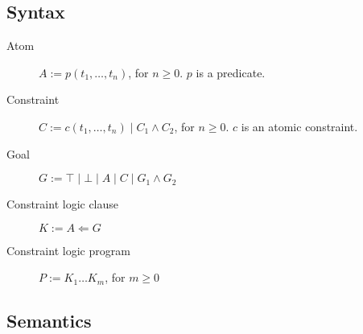 \subsection{Syntax}

\begin{description}
    \item[Atom] 
        $A := p(t_1, \dots, t_n)$, for $n \geq 0$. $p$ is a predicate.
    \item[Constraint] 
        $C := c(t_1, \dots, t_n) \mid C_1 \land C_2$, for $n \geq 0$. $c$ is an atomic constraint.
    \item[Goal] 
        $G := \top \mid \bot \mid A \mid C \mid G_1 \land G_2$ 
    \item[Constraint logic clause] 
        $K := A \Leftarrow G$ 
    \item[Constraint logic program] 
        $P := K_1 \dots K_m$, for $m \geq 0$ 
\end{description}


\subsection{Semantics}


